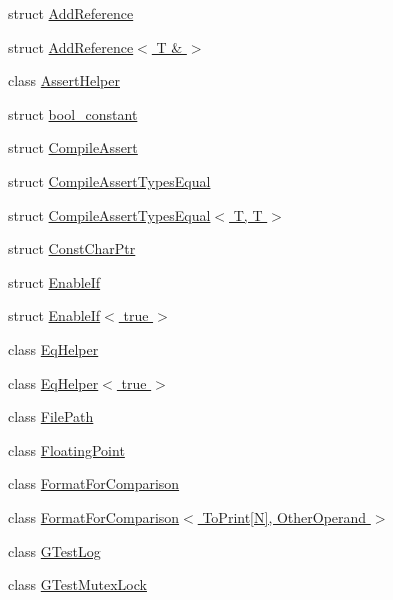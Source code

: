 \begin{DoxyCompactItemize}
\item 
struct \hyperlink{structtesting_1_1internal_1_1_add_reference}{Add\+Reference}
\item 
struct \hyperlink{structtesting_1_1internal_1_1_add_reference_3_01_t_01_6_01_4}{Add\+Reference$<$ T \& $>$}
\item 
class \hyperlink{classtesting_1_1internal_1_1_assert_helper}{Assert\+Helper}
\item 
struct \hyperlink{structtesting_1_1internal_1_1bool__constant}{bool\+\_\+constant}
\item 
struct \hyperlink{structtesting_1_1internal_1_1_compile_assert}{Compile\+Assert}
\item 
struct \hyperlink{structtesting_1_1internal_1_1_compile_assert_types_equal}{Compile\+Assert\+Types\+Equal}
\item 
struct \hyperlink{structtesting_1_1internal_1_1_compile_assert_types_equal_3_01_t_00_01_t_01_4}{Compile\+Assert\+Types\+Equal$<$ T, T $>$}
\item 
struct \hyperlink{structtesting_1_1internal_1_1_const_char_ptr}{Const\+Char\+Ptr}
\item 
struct \hyperlink{structtesting_1_1internal_1_1_enable_if}{Enable\+If}
\item 
struct \hyperlink{structtesting_1_1internal_1_1_enable_if_3_01true_01_4}{Enable\+If$<$ true $>$}
\item 
class \hyperlink{classtesting_1_1internal_1_1_eq_helper}{Eq\+Helper}
\item 
class \hyperlink{classtesting_1_1internal_1_1_eq_helper_3_01true_01_4}{Eq\+Helper$<$ true $>$}
\item 
class \hyperlink{classtesting_1_1internal_1_1_file_path}{File\+Path}
\item 
class \hyperlink{classtesting_1_1internal_1_1_floating_point}{Floating\+Point}
\item 
class \hyperlink{classtesting_1_1internal_1_1_format_for_comparison}{Format\+For\+Comparison}
\item 
class \hyperlink{classtesting_1_1internal_1_1_format_for_comparison_3_01_to_print[_n]_00_01_other_operand_01_4}{Format\+For\+Comparison$<$ To\+Print\mbox{[}\+N\mbox{]}, Other\+Operand $>$}
\item 
class \hyperlink{classtesting_1_1internal_1_1_g_test_log}{G\+Test\+Log}
\item 
class \hyperlink{classtesting_1_1internal_1_1_g_test_mutex_lock}{G\+Test\+Mutex\+Lock}
\item 

\end{DoxyCompactItemize}

